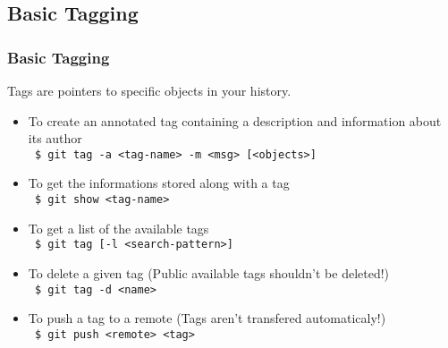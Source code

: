 \documentclass{beamer}
\begin{document}
\subsection*{Basic Tagging}
\begin{frame}
  \frametitle{Basic Tagging}
  Tags are pointers to specific objects in your history.
  \begin{itemize}
    \item To create an annotated tag containing a description and information about its author\\
      {\tt\ \$ git tag -a <tag-name> -m <msg> [<objects>]}
    \item To get the informations stored along with a tag\\
      {\tt\ \$ git show <tag-name>}
    \item To get a list of the available tags\\
      {\tt\ \$ git tag [-l <search-pattern>]}
    \item To delete a given tag (Public available tags shouldn't be deleted!)\\
      {\tt\ \$ git tag -d <name>}
    \item To push a tag to a remote (Tags aren't transfered automaticaly!)\\
      {\tt\ \$ git push <remote> <tag>}
  \end{itemize}
\end{frame}
\end{document}
